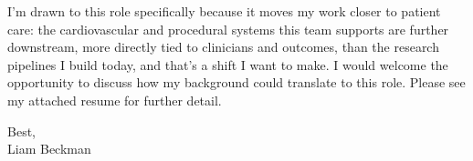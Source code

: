 \vspace*{\baselineskip}

I'm drawn to this role specifically because it moves my work closer to patient care: the cardiovascular and procedural systems this team supports are further downstream, more directly tied to clinicians and outcomes, than the research pipelines I build today, and that's a shift I want to make. I would welcome the opportunity to discuss how my background could translate to this role. Please see my attached resume for further detail.

\vspace*{\baselineskip}

Best,\\

Liam Beckman

\vfill \myBreak{}



